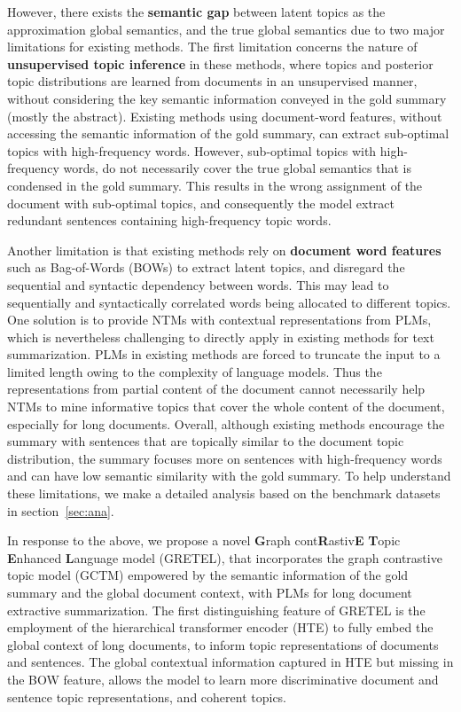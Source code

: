 \documentclass[11pt]{article}
\begin{document}
However, there exists the
\textbf{semantic gap} between latent topics as the approximation global semantics, and the true global semantics due to two major limitations for existing methods.
The first limitation concerns the nature of \textbf{unsupervised topic inference} in these methods, where topics and posterior topic distributions are learned from documents in an unsupervised manner, without considering the key semantic information conveyed in the gold summary (mostly the abstract). 
Existing methods using document-word features, without accessing the semantic information of the gold summary, can extract sub-optimal topics with high-frequency words.
However, sub-optimal topics with high-frequency words, do not necessarily cover the true global semantics that is condensed in the gold summary.
This results in the wrong assignment of the document with sub-optimal topics, and consequently the model extract redundant sentences containing high-frequency topic words.


Another limitation is that existing methods rely on \textbf{document word features} such as Bag-of-Words (BOWs) to extract latent topics, and disregard the sequential and syntactic dependency between words.
This may lead to sequentially and syntactically correlated words being allocated to different topics. One solution is to provide NTMs with contextual representations from PLMs, which is nevertheless challenging to directly apply in existing methods for text summarization. PLMs in existing methods are forced to truncate the input to a limited length owing to the complexity of language models.
Thus the representations from partial content of the document cannot necessarily help NTMs to mine informative topics that cover the whole content of the document, especially for long documents.
Overall, although existing methods encourage the summary with sentences that are topically similar to the document topic distribution, the summary focuses more on sentences with high-frequency words and can have low semantic similarity with the gold summary.
To help understand these limitations, we make a detailed analysis based on the benchmark datasets in section~\ref{sec:ana}.

In response to the above, we propose a novel \textbf{G}raph cont\textbf{R}astiv\textbf{E} \textbf{T}opic \textbf{E}nhanced \textbf{L}anguage model (GRETEL), that incorporates the graph contrastive topic model (GCTM) empowered by the semantic information of the gold summary and the global document context, with PLMs for long document extractive summarization.
The first distinguishing feature of GRETEL is the employment of the hierarchical transformer encoder (HTE) to fully embed the global context of long documents, to inform topic representations of documents and sentences.
The global contextual information captured in HTE but missing in the BOW feature, allows the model to learn more discriminative document and sentence topic representations, and coherent topics.
\end{document}
